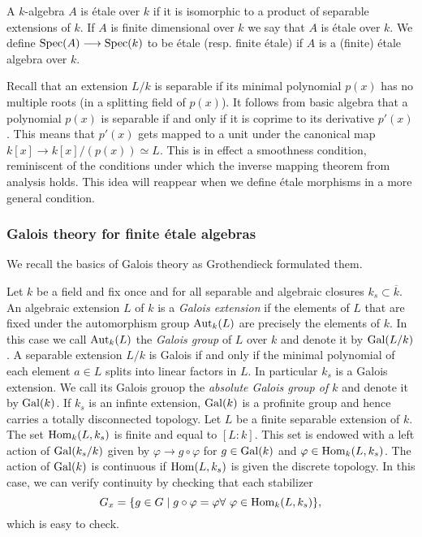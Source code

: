 \begin{definition}
  A $k$-algebra $A$ is \'etale over $k$ if it is isomorphic to a product of separable extensions of $k$. If $A$ is finite dimensional over $k$ we say that $A$ is \'etale over $k$. We define $\operatorname{Spec}(A) \longrightarrow \operatorname{Spec}(k)$ to be \'etale (resp. finite \'etale) if $A$ is a (finite) \'etale algebra over $k$.
\end{definition}

Recall that an extension $L/k$ is separable if its minimal polynomial $p(x)$ has no multiple roots (in a splitting field of $p(x)$). It follows from basic algebra that a polynomial $p(x)$ is separable if and only if it is coprime to its derivative $p'(x)$. This means that $p'(x)$ gets mapped to a unit under the canonical map $k[x] \to k[x]/(p(x)) \simeq L$. This is in effect a smoothness condition, reminiscent of the conditions under which the inverse mapping theorem from analysis holds. This idea will reappear when we define \'etale morphisms in a more general condition.

\subsubsection{Galois theory for finite \'etale algebras}
We recall the basics of Galois theory as Grothendieck formulated them.

\begin{construction}
  Let $k$ be a field and fix once and for all separable and algebraic closures $k_s \subset \overline{k}$.  An algebraic extension $L$ of $k$ is a \textit{Galois extension} if the elements of $L$ that are fixed under the automorphism group $\operatorname{Aut}_k(L)$ are precisely the elements of $k$. In this case we call $\operatorname{Aut}_k(L)$ the \textit{Galois group} of $L$ over $k$ and denote it by $\operatorname{Gal}(L/k)$. A separable extension $L/k$ is Galois if and only if the minimal polynomial of each element $a \in L$ splits into linear factors in $L$. In particular $k_s$ is a Galois extension. We call its Galois grouop the \textit{absolute Galois group of $k$} and denote it by $\operatorname{Gal}(k)$. If $k_s$ is an infinte extension, $\operatorname{Gal}(k)$ is a profinite group and hence carries a totally disconnected topology. Let $L$ be a finite separable extension of $k$. The set $\operatorname{Hom}_k(L, k_s)$ is finite and equal to $[L:k]$. This set is endowed with a left action of $\operatorname{Gal}(k_s/k)$ given by $\varphi \to g \circ \varphi$ for $g \in \operatorname{Gal}(k)$ and $\varphi \in \operatorname{Hom}_k(L, k_s)$. The action of $\operatorname{Gal}(k)$ is continuous if $\operatorname{Hom}(L, k_s)$ is given the discrete topology. In this case, we can verify continuity by checking that each stabilizer 
  \[G_x = \{ g \in G \mid g \circ \varphi =  \varphi \forall\ \varphi \in \operatorname{Hom}_k(L, k_s)\}, \]
  which is easy to check.
\end{construction}

